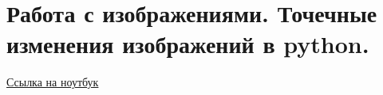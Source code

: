 \section{Работа с изображениями. Точечные изменения изображений в python.}

\href{https://github.com/andriygav/School/blob/master/2018/AD/Lecture/Lecture13.ipynb}{Ссылка на ноутбук}